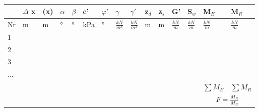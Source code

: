 \begin{minipage}{\linewidth}
	
	\begin{tabular}{l|l|l|l|l|l|l|l|l|l|l|l|l|l|l}
				& $ \Delta $ x	& (x)	& $ \alpha $	& $ \beta $	& c'	& $ \varphi' $	& $ \gamma $	& $ \gamma' $	& z$_d$	& z$_s$	& G'	& S$_w$	&	M$_E$	& M$_R$	\\ \hline
			
			Nr	& m	& m	& °	& °	& kPa	& °	& $ \frac{kN}{m^3} $	& $ \frac{kN}{m^3} $	& m	& m	& $ \frac{kN}{m} $	& $ \frac{kN}{m} $	& $ \frac{kN}{m} $	& $ \frac{kN}{m} $ \\ \hline
			
			1 &&&&&&&&&&&&&& \\
			2 &&&&&&&&&&&&&& \\
			3 &&&&&&&&&&&&&& \\
			... &&&&&&&&&&&&&& \\ \hline
			&&&&&&&&&&&&& $  \sum M_E $ & $  \sum M_R $ \\
			&&&&&&&&&&&&& \multicolumn{2}{c|}{$ F = \frac{M_R}{M_E}$} \\
	\end{tabular}

\end{minipage}